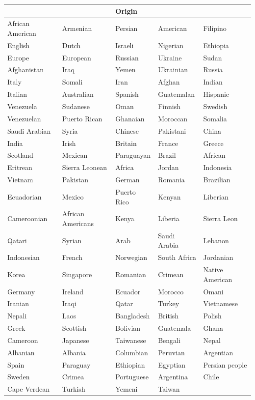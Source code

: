 \begin{table}[h!]
\begin{minipage}{.5\textwidth}
\begin{tabular}{ p{2.9cm} p{2.9cm} p{2.4cm} p{2.4cm} p{3cm}}
 \toprule
 &&Origin&\\
 \midrule
 African American&Armenian&Persian&American&Filipino \\English&Dutch&Israeli&Nigerian& Ethiopia \\ Europe& European& Russian& Ukraine&
Sudan \\ Afghanistan &Iraq& Yemen& Ukrainian& Russia \\
Italy& Somali& Iran& Afghan& Indian \\ Italian&
Australian& Spanish& Guatemalan& Hispanic \\ Venezuela& Sudanese&
Oman& Finnish& Swedish \\ Venezuelan& Puerto Rican& Ghanaian&
Moroccan& Somalia \\ Saudi Arabian& Syria& Chinese& Pakistani&
China \\ India& Irish& Britain& France& Greece \\
Scotland& Mexican& Paraguayan& Brazil& African \\ Eritrean&
Sierra Leonean& Africa& Jordan& Indonesia \\ Vietnam& Pakistan&
German& Romania &Brazilian \\ Ecuadorian& Mexico& Puerto Rico&
Kenyan& Liberian \\ Cameroonian& African Americans& Kenya& Liberia&
Sierra Leon \\ Qatari& Syrian& Arab& Saudi Arabia& Lebanon \\
Indonesian& French& Norwegian& South Africa& Jordanian \\ Korea
&Singapore& Romanian& Crimean& Native American \\ Germany& Ireland&
Ecuador& Morocco& Omani \\ Iranian& Iraqi& Qatar&
Turkey& Vietnamese \\ Nepali& Laos& Bangladesh& British&
Polish \\ Greek& Scottish& Bolivian& Guatemala& Ghana \\
Cameroon& Japanese& Taiwanese&Bengali& Nepal \\ Albanian&
Albania& Columbian& Peruvian& Argentian \\ Spain& Paraguay&
Ethiopian& Egyptian& Persian people \\ Sweden& Crimea& Portuguese&
Argentina& Chile \\ Cape Verdean& Turkish& Yemeni& Taiwan&

\end{tabular}
\end{minipage}
\end{table}
